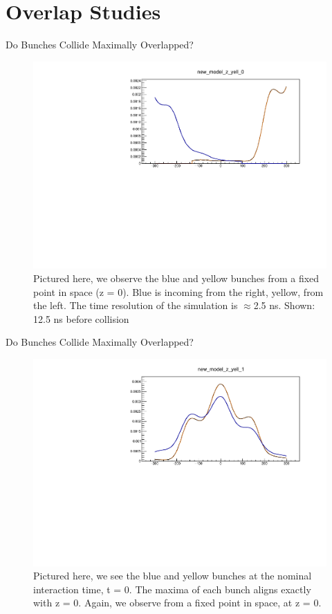 \section{Overlap Studies}
\label{ch:OverlapStudies}

\begin{frame}{Do Bunches Collide Maximally Overlapped?}
\begin{figure}
\begin{center}
\includegraphics[width=0.8\linewidth]{../OverlapTest/figs/359711_time_step_0_bunch_collision.pdf}
\end{center}
\caption{Pictured here, we observe the blue and yellow bunches from a fixed
point in space (z = 0). Blue is incoming from the right, yellow, from the left.
The time resolution of the simulation is $\approx$2.5 ns. Shown: 12.5 ns before
collision }
\label{fig:359711_time_step_0_bunch_collision}
\end{figure}
\end{frame}

\begin{frame}{Do Bunches Collide Maximally Overlapped?}
\begin{figure}
\begin{center}
\includegraphics[width=0.8\linewidth]{../OverlapTest/figs/359711_time_step_1_bunch_collision.pdf}
\end{center}
\caption{Pictured here, we see the blue and yellow bunches at the nominal
interaction time, t = 0. The maxima of each bunch aligns exactly with z = 0.
Again, we observe from a fixed point in space, at z = 0. }
\label{fig:359711_time_step_1_bunch_collision}
\end{figure}
\end{frame}

